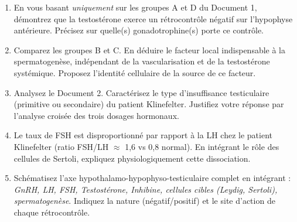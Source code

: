 \documentclass[11pt]{article}
\begin{document}
\begin{exercice}
\begin{enumerate}
\item En vous basant \textit{uniquement} sur les groupes A et D du Document 1, démontrez que la testostérone exerce un rétrocontrôle négatif sur l'hypophyse antérieure. Précisez sur quelle(s) gonadotrophine(s) porte ce contrôle.
\item Comparez les groupes B et C. En déduire le facteur local indispensable à la spermatogenèse, indépendant de la vascularisation et de la testostérone systémique. Proposez l'identité cellulaire de la source de ce facteur.
\item Analysez le Document 2. Caractérisez le type d'insuffisance testiculaire (primitive ou secondaire) du patient Klinefelter. Justifiez votre réponse par l'analyse croisée des trois dosages hormonaux.
\item Le taux de FSH est disproportionné par rapport à la LH chez le patient Klinefelter (ratio FSH/LH $\approx$ 1,6 vs 0,8 normal). En intégrant le rôle des cellules de Sertoli, expliquez physiologiquement cette dissociation.
\item Schématisez l'axe hypothalamo-hypophyso-testiculaire complet en intégrant : \textit{GnRH, LH, FSH, Testostérone, Inhibine, cellules cibles (Leydig, Sertoli), spermatogenèse}. Indiquez la nature (négatif/positif) et le site d'action de chaque rétrocontrôle.
\end{enumerate}
\end{exercice}
\end{document}
